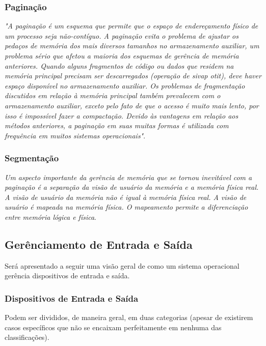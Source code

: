 \subsubsection{Paginação}

\textit{"A paginação é um esquema que permite que o espaço de endereçamento físico de um processo seja
	não-contíguo. A paginação evita o problema de ajustar os pedaços de memória dos mais diversos tamanhos
	no armazenamento auxiliar, um problema sério que afetou a maioria dos esquemas de gerência de memória
	anteriores. Quando alguns fragmentos de código ou dados que residem na memória principal precisam ser
	descarregados (operação de sivap otit), deve haver espaço disponível no armazenamento auxiliar. Os problemas de fragmentação discutidos em relação à memória principal também prevalecem com o armazenamento
	auxiliar, exceto pelo fato de que o acesso é muito mais lento, por isso é impossível fazer a compactação. Devido às vantagens em relação aos métodos anteriores, a paginação em suas muitas formas é utilizada com frequência em muitos sistemas operacionais"}. \citep[p.189]{silberschatz2008sistemas}

\subsubsection{Segmentação}

\textit{Um aspecto importante da gerência de memória que se tornou inevitável com a paginação é a separação da visão de usuário da memória e a memória física real. A visão de usuário da memória não é igual à memória física
	real. A visão de usuário é mapeada na memória física. O mapeamento permite a diferenciação entre memória
	lógica e física}. \citep[p.200]{silberschatz2008sistemas}

\subsection{Gerênciamento de Entrada e Saída}

Será apresentado a seguir uma visão geral de como um sistema operacional gerência dispositivos de entrada e saída.

\subsubsection{Dispositivos de Entrada e Saída}

Podem ser divididos, de maneira geral, em duas categorias (apesar de existirem casos específicos que não se encaixam perfeitamente em nenhuma das classificações).

